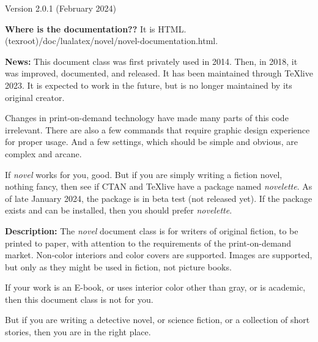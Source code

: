 \documentclass[v2]{novel} %
\begin{document}
\thispagestyle{empty}
\begin{ChapterStart}[8]
\vspace{\nbs} %
\vspace{\nbs}
{\centering Version 2.0.1 (February 2024)\par}
\end{ChapterStart}

\textbf{Where is the documentation??} It is HTML.\\
(texroot)/doc/lualatex/novel/novel-documentation.html.

\scenebreak

\textbf{News:} This document class was first privately used in 2014.
Then, in 2018, it was improved, documented, and released. It has been
maintained through TeXlive 2023. It is expected to work in the future, but is
no longer maintained by its original creator.\par
Changes in print-on-demand technology have made many parts of this code
irrelevant. There are also a few commands that require graphic design
experience for proper usage. And a few settings, which should be simple and
obvious, are complex and arcane.\par
If \emph{novel} works for you, good. But if you are simply writing a fiction
novel, nothing fancy, then see if CTAN and TeXlive have a package named
\emph{novelette}. As of late January 2024, the package is in beta test
(not released yet). If the package exists and can be installed, then you
should prefer \emph{novelette}. 

\scenebreak

\textbf{Description:} The \emph{novel} document class is for writers of
original fiction, to be printed to paper, with attention to the requirements
of the print-on-demand market. Non-color interiors and color covers are
supported. Images are supported, but only as they might be used in fiction,
not picture books.

If your work is an E-book, or uses interior color other than gray, or is
academic, then this document class is not for you. 

But if you are writing a detective novel, or science fiction, or a collection
of short stories, then you are in the right place.

\makeatletter\nocle@rtoendtrue\makeatother %
\end{document}
